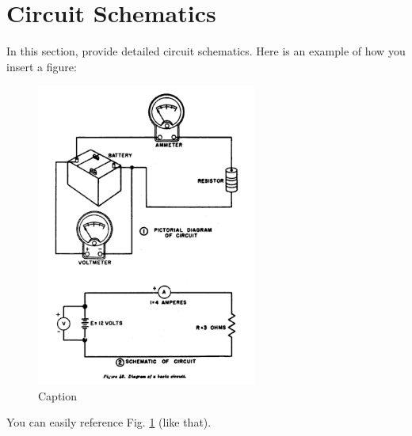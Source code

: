 \section{Circuit Schematics}

In this section, provide detailed circuit schematics. Here is an example of how you insert a figure: 
\begin{figure}[ht]
    \centering
    \includegraphics[height=10cm]{Circuit_diagram.png}
     \caption{Caption}
    \label{fig:Circuit}
\end{figure}

You can easily reference Fig. \ref{fig:Circuit} (like that). 